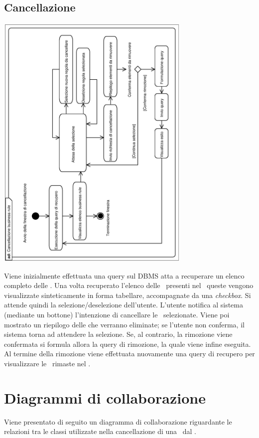 \documentclass[11pt,titlepage,a4paper]{report}
\begin{document}
\subsection{Cancellazione \br}
\begin{center}
 \includegraphics[width=0.7\textwidth, angle=-90]{CancellazioneBusinessRule.eps}
\end{center}
Viene inizialmente effettuata una query sul DBMS atta a recuperare un elenco completo delle \brs. Una volta recuperato l'elenco delle \brs\ presenti nel \re\ queste vengono visualizzate sinteticamente in forma tabellare, accompagnate da una \textit{checkbox}. Si attende quindi la selezione/deselezione dell'utente. L'utente notifica al sistema (mediante un bottone) l'intenzione di cancellare le \brs\ selezionate.  Viene poi mostrato un riepilogo delle \brs che verranno eliminate; se l'utente non conferma, il sistema torna ad attendere la selezione. Se, al contrario, la rimozione viene confermata si formula allora la query di rimozione, la quale viene infine eseguita. Al termine della rimozione viene effettuata nuovamente una query di recupero per visualizzare le \brs\ rimaste nel \re.

\section{Diagrammi di collaborazione}
Viene presentato di seguito un diagramma di collaborazione riguardante le relazioni tra le classi utilizzate nella cancellazione di una \br\ dal \re.
\end{document}
